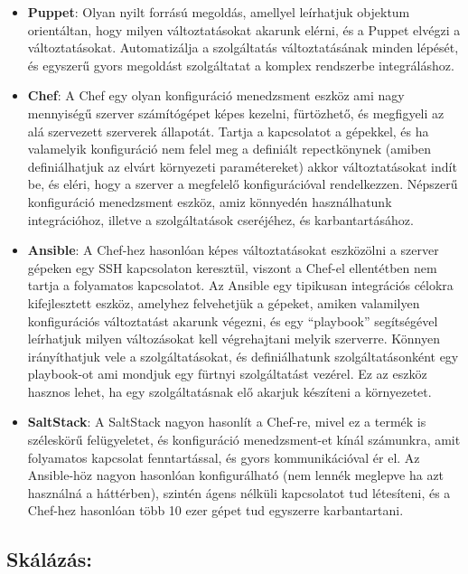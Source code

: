 \documentclass[11pt,magyar,a4paper,oneside,]{report}
\begin{document}
\begin{itemize}
\item
  \textbf{Puppet}: Olyan nyilt forrású megoldás, amellyel leírhatjuk
  objektum orientáltan, hogy milyen változtatásokat akarunk elérni, és a
  Puppet elvégzi a változtatásokat. Automatizálja a szolgáltatás
  változtatásának minden lépését, és egyszerű gyors megoldást
  szolgáltatat a komplex rendszerbe integráláshoz.
\item
  \textbf{Chef}: A Chef egy olyan konfiguráció menedzsment eszköz ami
  nagy mennyiségű szerver számítógépet képes kezelni, fürtözhető, és
  megfigyeli az alá szervezett szerverek állapotát. Tartja a kapcsolatot
  a gépekkel, és ha valamelyik konfiguráció nem felel meg a definiált
  repectkönynek (amiben definiálhatjuk az elvárt környezeti
  paramétereket) akkor változtatásokat indít be, és eléri, hogy a
  szerver a megfelelő konfigurációval rendelkezzen. Népszerű
  konfiguráció menedzsment eszköz, amiz könnyedén használhatunk
  integrációhoz, illetve a szolgáltatások cseréjéhez, és
  karbantartásához.
\item
  \textbf{Ansible}: A Chef-hez hasonlóan képes változtatásokat
  eszközölni a szerver gépeken egy SSH kapcsolaton keresztül, viszont a
  Chef-el ellentétben nem tartja a folyamatos kapcsolatot. Az Ansible
  egy tipikusan integrációs célokra kifejlesztett eszköz, amelyhez
  felvehetjük a gépeket, amiken valamilyen konfigurációs változtatást
  akarunk végezni, és egy ``playbook'' segítségével leírhatjuk milyen
  változásokat kell végrehajtani melyik szerverre. Könnyen irányíthatjuk
  vele a szolgáltatásokat, és definiálhatunk szolgáltatásonként egy
  playbook-ot ami mondjuk egy fürtnyi szolgáltatást vezérel. Ez az
  eszköz hasznos lehet, ha egy szolgáltatásnak elő akarjuk készíteni a
  környezetet.
\item
  \textbf{SaltStack}: A SaltStack nagyon hasonlít a Chef-re, mivel ez a
  termék is széleskörű felügyeletet, és konfiguráció menedzsment-et
  kínál számunkra, amit folyamatos kapcsolat fenntartással, és gyors
  kommunikációval ér el. Az Ansible-höz nagyon hasonlóan konfigurálható
  (nem lennék meglepve ha azt használná a háttérben), szintén ágens
  nélküli kapcsolatot tud létesíteni, és a Chef-hez hasonlóan több 10
  ezer gépet tud egyszerre karbantartani.
\end{itemize}

\subsection{Skálázás:}\label{skuxe1luxe1zuxe1s}
\end{document}
